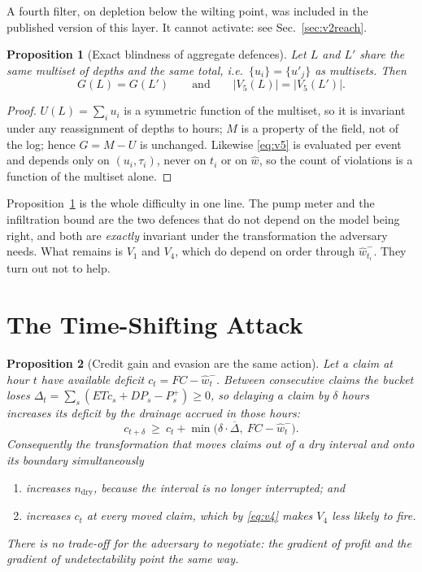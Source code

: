 \documentclass[journal]{IEEEtran}
\newtheorem{proposition}{Proposition}
\begin{document}
A fourth filter, on depletion below the wilting point, was included in the
published version of this layer. It cannot activate: see
Sec.~\ref{sec:v2reach}.

\begin{proposition}[Exact blindness of aggregate defences]
\label{prop:blind}
Let $L$ and $L'$ share the same multiset of depths and the same total, i.e.\
$\{u_i\}=\{u'_j\}$ as multisets. Then
\begin{equation}
G(L)=G(L')\qquad\text{and}\qquad |V_5(L)|=|V_5(L')|.
\end{equation}
\end{proposition}

\begin{proof}
$U(L)=\sum_i u_i$ is a symmetric function of the multiset, so it is invariant
under any reassignment of depths to hours; $M$ is a property of the field, not of
the log; hence $G=M-U$ is unchanged. Likewise \eqref{eq:v5} is evaluated per
event and depends only on $(u_i,\tau_i)$, never on $t_i$ or on $\hat w$, so the
count of violations is a function of the multiset alone.
\end{proof}

Proposition~\ref{prop:blind} is the whole difficulty in one line. The pump meter
and the infiltration bound are the two defences that do not depend on the model
being right, and both are \emph{exactly} invariant under the transformation the
adversary needs. What remains is $V_1$ and $V_4$, which do depend on order
through $\hat w_{t_i}^{-}$. They turn out not to help.

\section{The Time-Shifting Attack}
\label{sec:timeshift}

\begin{proposition}[Credit gain and evasion are the same action]
\label{prop:coincide}
Let a claim at hour $t$ have available deficit $c_t=FC-\hat w_t^{-}$. Between
consecutive claims the bucket loses
$\Delta_t=\sum_{s}(\mathit{ETc}_s+\mathit{DP}_s-P_s^{+})\ge 0$, so delaying a
claim by $\delta$ hours increases its deficit by the drainage accrued in those
hours:
\begin{equation}
c_{t+\delta}\ \ge\ c_t+\min\!\bigl(\delta\cdot\overline{\Delta},\ FC-\hat w_t^{-}\bigr).
\label{eq:delay}
\end{equation}
Consequently the transformation that moves claims \emph{out of} a dry interval
and onto its boundary simultaneously
\begin{enumerate}
\item[(i)] increases $n_{\mathrm{dry}}$, because the interval is no longer
interrupted; and
\item[(ii)] increases $c_t$ at every moved claim, which by \eqref{eq:v4} makes
$V_4$ \emph{less} likely to fire.
\end{enumerate}
There is no trade-off for the adversary to negotiate: the gradient of profit and
the gradient of undetectability point the same way.
\end{proposition}
\end{document}
